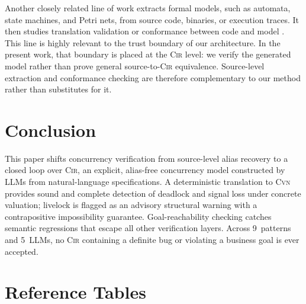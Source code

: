 \documentclass[sigconf]{acmart}
\begin{document}
Another closely related line of work extracts formal models, such as automata, state machines, and Petri nets, from source code, binaries, or execution traces. It then studies translation validation or conformance between code and model \cite{Ball2002SLAM,Henzinger2003BLAST,Beyer2011CPAchecker,Necula2000TranslationValidation}. This line is highly relevant to the trust boundary of our architecture. In the present work, that boundary is placed at the \textsc{Cir} level: we verify the generated model rather than prove general source-to-\textsc{Cir} equivalence. Source-level extraction and conformance checking are therefore complementary to our method rather than substitutes for it. 


\section{Conclusion}
\label{sec:conclusion}

This paper shifts concurrency verification from source-level alias recovery to a closed loop over \textsc{Cir}, an explicit, alias-free concurrency model constructed by LLMs from natural-language specifications. A deterministic translation to \textsc{Cvn} provides sound and complete detection of deadlock and signal loss under concrete valuation; livelock is flagged as an advisory
structural warning with a contrapositive impossibility guarantee. Goal-reachability checking catches semantic regressions that escape all other verification layers. Across 9~patterns and 5~LLMs, no \textsc{Cir} containing a definite bug or violating a business goal is ever accepted.





\appendix
\section{Reference Tables}
\label{app:tables}
\end{document}
